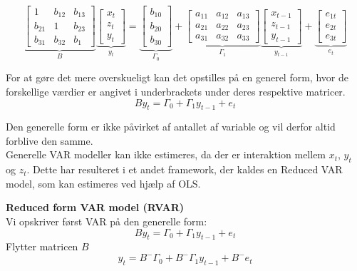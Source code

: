 \documentclass[
  10pt,
]{article}
\begin{document}
\[ \underbrace{
\left[ \begin{array}{ccc}
1 & b_{12} & b_{13} \\
b_{21}  & 1 & b_{23} \\
b_{31}  & b_{32} & b_{1}
\end{array} \right] }_{B} 
\underbrace{
\left[ \begin{array}{c}
x_{t} \\
z_{t} \\
y_{t} 
\end{array} \right] }_{y_t} 
=
\underbrace{
\left[ \begin{array}{c}
b_{10} \\
b_{20}  \\
b_{30}
\end{array} \right] }_{\Gamma_0}  +
\underbrace{
\left[ \begin{array}{ccc}
a_{11} & a_{12} & a_{13} \\
a_{21} & a_{22} & a_{23}\\
a_{31} & a_{32} & a_{33}
\end{array} \right] }_{\Gamma_1} 
\underbrace{
\left[ \begin{array}{c}
x_{t-1} \\
z_{t-1} \\
y_{t-1}
\end{array} \right] }_{y_{t-1}}  + 
\underbrace{
\left[ \begin{array}{c}
e_{1 t} \\
e_{2t} \\
e_{3t}
\end{array} \right] }_{e_t} \]

For at gøre det mere overskueligt kan det opstilles på en generel form,
hvor de forskellige værdier er angivet i underbrackets under deres
respektive matricer. \[ By_t=\Gamma_0+\Gamma_1y_{t-1}+e_t\]

Den generelle form er ikke påvirket af antallet af variable og vil
derfor altid forblive den samme.\\

Generelle VAR modeller kan ikke estimeres, da der er interaktion mellem
\(x_t\), \(y_t\) og \(z_t\). Dette har resulteret i et andet framework,
der kaldes en Reduced VAR model, som kan estimeres ved hjælp af OLS.
\newpage

\textbf{Reduced form VAR model (RVAR)}\\
Vi opskriver først VAR på den generelle form:
\[ By_t=\Gamma_0+\Gamma_1y_{t-1}+e_t\] Flytter matricen \(B\)
\[ y_t=B^-\Gamma_0+B^-\Gamma_1y_{t-1}+B^-e_t\]
\end{document}

